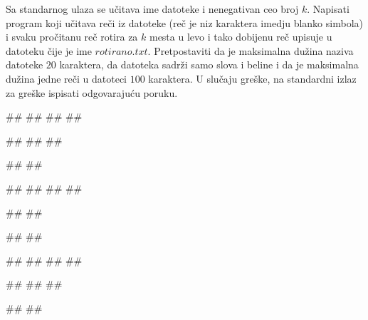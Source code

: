 \begin{Exercise}[label=p3_id18]         
Sa standarnog ulaza se učitava ime datoteke i nenegativan ceo
broj $k$. Napisati program koji učitava reči iz datoteke (reč je niz karaktera imedju blanko simbola) i svaku pročitanu reč
rotira za $k$ mesta u levo i tako dobijenu reč upisuje u datoteku čije je ime $rotirano.txt$. 
Pretpostaviti da je maksimalna dužina naziva datoteke $20$ karaktera, da
datoteka sadrži samo slova i beline i da je maksimalna dužina jedne reči u datoteci $100$ karaktera.
U slučaju greške, na standardni izlaz za greške ispisati odgovarajuću poruku.

\begin{minitest}
\begin{upotreba}{1}
#\naslovInt#
##
##
##

##
##
##

##
##
\end{upotreba}
\end{minitest}
\begin{minitest}
\begin{upotreba}{2}
#\naslovInt#
##
##
##

##
##

##
##
\end{upotreba}
\end{minitest}
\begin{minitest}
\begin{upotreba}{3}
#\naslovInt#
##
##
##

##
##
##

##
##
\end{upotreba}
\end{minitest}

\end{Exercise}
\begin{Answer}[ref=p3_id18]
\end{Answer}


